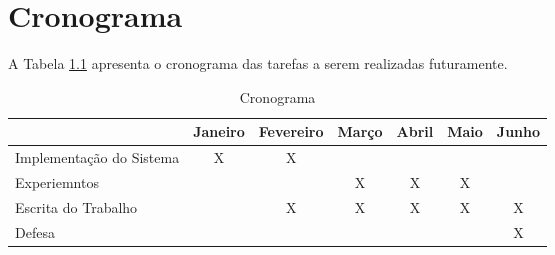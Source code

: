 \chapter{Cronograma}

A Tabela \ref{tabela:cronograma} apresenta o cronograma das tarefas a serem realizadas futuramente.

\begin{table}[]
	\captionsetup{justification=centering}
	\caption{Cronograma}
	\label{tabela:cronograma}
	\begin{tabular}{|l|c|c|c|c|c|c|}
		\hline
		& Janeiro & Fevereiro & Março & Abril & Maio & Junho \\ \hline
		Implementação do Sistema & X       & X         &       &       &      &       \\ \hline
		Experiemntos             &         &           & X     & X     & X    &       \\ \hline
		Escrita do Trabalho      &         & X         & X     & X     & X    & X     \\ \hline
		Defesa                   &         &           &       &       &      & X     \\ \hline
	\end{tabular}
\end{table}